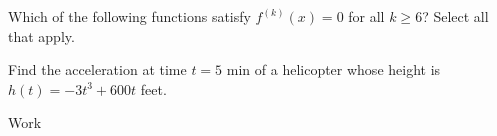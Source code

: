 \documentclass[12pt,addpoints, answers, fleqn]{exam}
\begin{document}
\begin{teacher}
\begin{questions}
Which of the following functions satisfy $f^{\left(k\right)} \left(x\right) = 0$ for all $k \geq 6$? Select all that apply.

\question 	%

Find the acceleration at time $t = 5$ min of a helicopter whose height is $h\left(t\right) = -3t^3 + 600t$ feet.
\begin{solution}
Work
\end{solution}


\question 	%


\end{questions}
\end{teacher}
\end{document}
